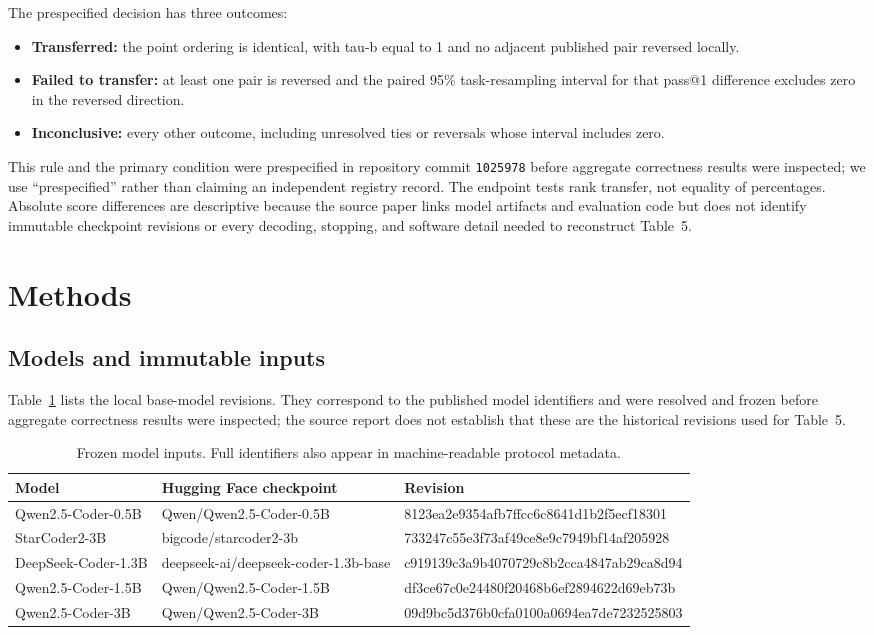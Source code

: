 \documentclass[10pt,twocolumn]{article}
\newcommand{\code}[1]{\texttt{#1}}
\begin{document}
The prespecified decision has three outcomes:

\begin{itemize}
  \item \textbf{Transferred:} the point ordering is identical, with tau-b equal to 1 and no adjacent published pair reversed locally.
  \item \textbf{Failed to transfer:} at least one pair is reversed and the paired 95\% task-resampling interval for that pass@1 difference excludes zero in the reversed direction.
  \item \textbf{Inconclusive:} every other outcome, including unresolved ties or reversals whose interval includes zero.
\end{itemize}

This rule and the primary condition were prespecified in repository commit \code{1025978} before aggregate correctness results were inspected; we use ``prespecified'' rather than claiming an independent registry record. The endpoint tests rank transfer, not equality of percentages. Absolute score differences are descriptive because the source paper links model artifacts and evaluation code but does not identify immutable checkpoint revisions or every decoding, stopping, and software detail needed to reconstruct Table~5.

\section{Methods}

\subsection{Models and immutable inputs}

Table~\ref{tab:models} lists the local base-model revisions. They correspond to the published model identifiers and were resolved and frozen before aggregate correctness results were inspected; the source report does not establish that these are the historical revisions used for Table~5.

\begin{table}[t]
\centering
\caption{Frozen model inputs. Full identifiers also appear in machine-readable protocol metadata.}
\label{tab:models}
\small
\begin{tabularx}{\textwidth}{@{}l l >{\ttfamily\scriptsize}X@{}}
\toprule
Model & Hugging Face checkpoint & \normalfont Revision \\
\midrule
Qwen2.5-Coder-0.5B & Qwen/Qwen2.5-Coder-0.5B & 8123ea2e9354afb7ffcc6c8641d1b2f5ecf18301 \\
StarCoder2-3B & bigcode/starcoder2-3b & 733247c55e3f73af49ce8e9c7949bf14af205928 \\
DeepSeek-Coder-1.3B & deepseek-ai/deepseek-coder-1.3b-base & c919139c3a9b4070729c8b2cca4847ab29ca8d94 \\
Qwen2.5-Coder-1.5B & Qwen/Qwen2.5-Coder-1.5B & df3ce67c0e24480f20468b6ef2894622d69eb73b \\
Qwen2.5-Coder-3B & Qwen/Qwen2.5-Coder-3B & 09d9bc5d376b0cfa0100a0694ea7de7232525803 \\
\bottomrule
\end{tabularx}
\end{table}
\end{document}
